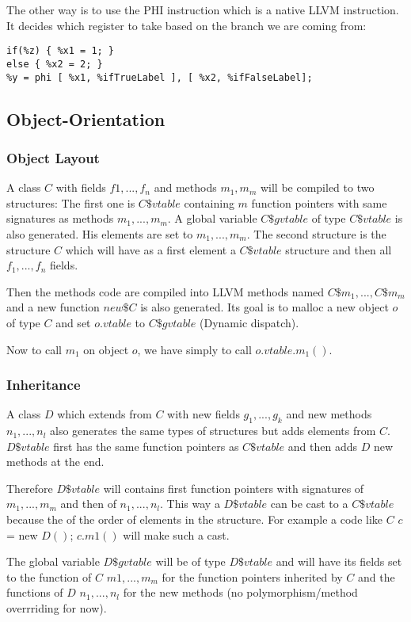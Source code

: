 The other way is to use the PHI instruction which is a native LLVM instruction. It decides which register to take based on the branch we are coming from:
\begin{lstlisting}
if(%z) { %x1 = 1; } 
else { %x2 = 2; }
%y = phi [ %x1, %ifTrueLabel ], [ %x2, %ifFalseLabel];
\end{lstlisting}

\subsection{Object-Orientation}
\subsubsection{Object Layout}
A class $C$ with fields $f1, ..., f_n$ and methods $m_1, m_m$ will be compiled to two structures: The first one is $C\$vtable$ containing $m$ function pointers with same signatures as methods $m_1, ..., m_m$. A global variable $C\$gvtable$ of type $C\$vtable$ is also generated. His elements are set to $m_1, ..., m_m$. The second structure is the structure $C$ which will have as a first element a $C\$vtable$ structure and then all $f_1, ..., f_n$ fields.

Then the methods code are compiled into LLVM methods named $C\$m_1, ..., C\$m_m$ and a new function $new\$C$ is also generated. Its goal is to malloc a new object $o$ of type $C$ and  set $o.vtable$ to $C\$gvtable$ (Dynamic dispatch).

Now to call $m_1$ on object $o$, we have simply to call $o.vtable.m_1()$.

\subsubsection{Inheritance}
A class $D$ which extends from $C$ with new fields $g_1, ..., g_k$ and new methods $n_1, ..., n_l$ also generates the same types of structures but adds elements from $C$. $D\$vtable$ first has the same function pointers as $C\$vtable$ and then adds $D$ new methods at the end.

 Therefore $D\$vtable$ will contains first function pointers with signatures of $m_1, ..., m_m$ and then of $n_1, ..., n_l$. This way a $D\$vtable$ can be cast to a $C\$vtable$ because the of the order of elements in the structure. For example a code like $C$ $c$ = new $D()$; $c.m1()$ will make such a cast.

The global variable $D\$gvtable$ will be of type $D\$vtable$ and will have its fields set to the function of $C$ $m1, ..., m_m$ for the function pointers inherited by $C$ and the functions of $D$ $n_1, ..., n_l$ for the new methods (no polymorphism/method overrriding for now).

